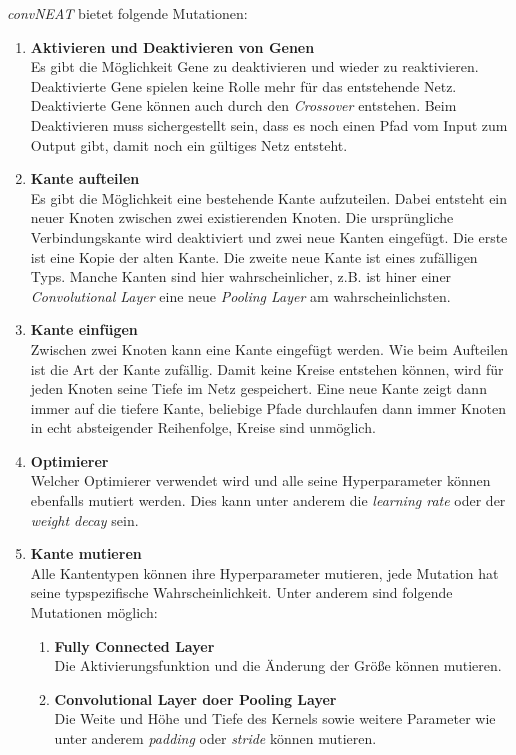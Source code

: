 \documentclass[]{scrartcl}
\begin{document}
			\textit{convNEAT} bietet folgende Mutationen:

			\begin{enumerate}
				\item [] \textbf{Aktivieren und Deaktivieren von Genen} \\
					Es gibt die Möglichkeit Gene zu deaktivieren und wieder zu reaktivieren. Deaktivierte Gene spielen keine Rolle mehr für das entstehende Netz.
					Deaktivierte Gene können auch durch den \textit{Crossover} entstehen. Beim Deaktivieren muss sichergestellt sein, dass
					es noch einen Pfad vom Input zum Output gibt, damit noch ein gültiges Netz entsteht.

				\item [] \textbf{Kante aufteilen} \\
					Es gibt die Möglichkeit eine bestehende Kante aufzuteilen. Dabei entsteht ein neuer Knoten zwischen zwei existierenden Knoten.
					Die ursprüngliche Verbindungskante wird deaktiviert und zwei neue Kanten eingefügt. Die erste ist eine Kopie der alten Kante.
					Die zweite neue Kante ist eines zufälligen Typs. Manche Kanten sind hier wahrscheinlicher, z.B. ist hiner einer
					\textit{Convolutional Layer} eine neue \textit{Pooling Layer} am wahrscheinlichsten.

				\item [] \textbf{Kante einfügen} \\
					Zwischen zwei Knoten kann eine Kante eingefügt werden. Wie beim Aufteilen ist die Art der Kante zufällig.
					Damit keine Kreise entstehen können, wird für jeden Knoten seine Tiefe im Netz gespeichert.
					Eine neue Kante zeigt dann immer auf die tiefere Kante, beliebige Pfade durchlaufen dann immer Knoten in echt absteigender Reihenfolge,
					Kreise sind unmöglich.

				\item [] \textbf{Optimierer} \\
					Welcher Optimierer verwendet wird und alle seine Hyperparameter können ebenfalls mutiert werden.
					Dies kann unter anderem die \textit{learning rate} oder der \textit{weight decay} sein.

				\item [] \textbf{Kante mutieren} \\
					Alle Kantentypen können ihre Hyperparameter mutieren, jede Mutation hat seine typspezifische Wahrscheinlichkeit.
					Unter anderem sind folgende Mutationen möglich:
					\begin{enumerate}
						\item [] \textbf{Fully Connected Layer} \\
							Die Aktivierungsfunktion und die Änderung der Größe können mutieren.
						\item [] \textbf{Convolutional Layer doer Pooling Layer} \\
							Die Weite und Höhe und Tiefe des Kernels sowie weitere Parameter wie unter anderem \textit{padding} oder \textit{stride} können mutieren.
					\end{enumerate}
			\end{enumerate}
\end{document}
